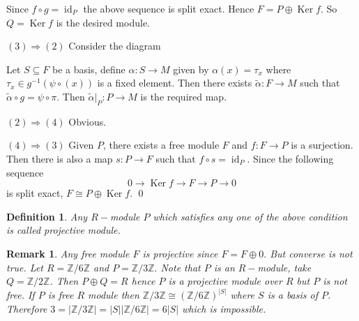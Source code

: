 \documentclass[11pt]{amsart}
\newtheorem{defn}[theorem]{Definition}
\newtheorem{remark}[theorem]{Remark}%
\newcommand{\ZZ}{\mathbb Z}
\DeclareMathOperator{\Ker}{\text{Ker}}
\DeclareMathOperator{\id}{\text{id}}
\begin{document}
\begin{center}


\end{center}

Since $f\circ g=\id_P$ the above sequence is split exact. Hence $F=P\oplus \Ker f$. So $Q=\Ker f$ is the desired module.

$(3) \Rightarrow (2)$ Consider the diagram 

\begin{center}


\end{center}

Let $S\subseteq F$ be a basis, define $\alpha:S\to M$ given by $\alpha(x)=\tau_x$ where $\tau_x\in g^{-1}(\psi\circ (x))$ is a fixed element. Then there exists $\tilde{\alpha}:F\to M$ such that $\tilde{\alpha}\circ g=\psi\circ \pi.$ Then $\tilde{\alpha}|_P:P\to M$ is the required map.

$(2)\Rightarrow (4)$ Obvious.

$(4)\Rightarrow (3)$ Given $P$, there exists a free module $F$ and $f:F\to P$ is a surjection. Then there is also a map $s:P\to F$ such that $f\circ s=\id_P.$ Since the following sequence $$0\to\Ker f\to F\to P\to 0$$ is split exact, $F\cong P\oplus \Ker f.$ \qed

\begin{defn}
Any $R-$module $P$ which satisfies any one of the above condition is called projective module.
\end{defn}

\begin{remark}
Any free module $F$ is projective since $F=F\oplus 0.$ But converse is not true. Let $R={\ZZ}/6{\ZZ}$ and $P={\ZZ}/3{\ZZ}.$ Note that $P$ is an $R-$module, take $Q={\ZZ}/2{\ZZ}$. Then $P\oplus Q=R$ hence $P$ is a projective module over $R$ but $P$ is not free. If $P$ is free $R$ module then ${\ZZ}/3{\ZZ}\cong ({\ZZ}/6{\ZZ})^{|S|}$ where $S$ is a basis of $P$. Therefore $3=|{\ZZ}/3{\ZZ}|=|S||{\ZZ}/6{\ZZ}|=6|S|$ which is impossible.
\end{remark}
\end{document}
